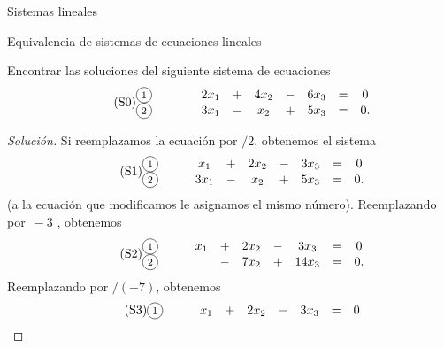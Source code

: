 \begin{chapter}{Sistemas lineales}
\begin{section}{Equivalencia de sistemas de ecuaciones lineales}
    
            \begin{ejemplo*}
                Encontrar las soluciones del siguiente sistema de ecuaciones
                \begin{equation*}\label{sist-000} \tag{S0}
                \begin{matrix}
                \text{{\footnotesize\circled{1}}}&\qquad& 2x_1 &+&4x_2 &-& 6x_3 &=& 0 \\
                \text{{\footnotesize\circled{2}}}&\qquad& 3x_1 &-& x_2 &+& 5x_3 &=& 0.
                \end{matrix}
                \end{equation*}
            \end{ejemplo*}
            \begin{proof}[Solución]
                Si reemplazamos la ecuación {\footnotesize{}} por {\footnotesize{}}$/2$, obtenemos el sistema
                \begin{align*}\label{sist-001} \tag{S1}
                \begin{matrix}
                \text{\footnotesize\circled{1}}&\qquad x_1 &+&2x_2 &-& 3x_3 &=& 0 \\
                \text{\footnotesize\circled{2}}&\qquad 3x_1 &-& x_2 &+& 5x_3 &=& 0.
                \end{matrix}
                \end{align*}
                (a la ecuación que modificamos le asignamos el mismo número). Reemplazando   por  $\,-3$ , obtenemos
                \begin{align*}\label{sist-002} \tag{S2}
                \begin{matrix}
                    \text{\footnotesize\circled{1}}&\qquad x_1 &+&2x_2 &-& 3x_3 &=& 0 \\
                    \text{\footnotesize\circled{2}}&\qquad &-&7 x_2 &+& 14x_3 &=& 0.
                \end{matrix}
                \end{align*} 
                Reemplazando  por $/(-7)$, obtenemos
                \begin{align*}\label{sist-003} \tag{S3}
                \begin{matrix}
                    \text{\footnotesize\circled{1}}&\qquad x_1 &+&2x_2 &-& 3x_3 &=& 0 \\

\end{matrix}
\end{align*}
\end{proof}
\end{section}
\end{chapter}
